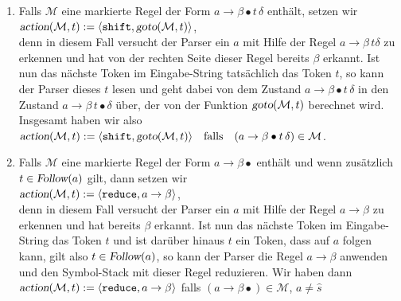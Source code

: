 \begin{enumerate}
\item Falls $\mathcal{M}$ eine markierte Regel der Form $a \rightarrow \beta \bullet t\, \delta$
      enth\"alt, setzen wir
      \\[0.2cm]
      \hspace*{1.3cm}
      $\textsl{action}(\mathcal{M},t) := \langle \texttt{shift}, \textsl{goto}(\mathcal{M},t) \rangle$,
      \\[0.2cm]
      denn in diesem Fall versucht der Parser ein $a$ mit Hilfe der Regel $a \rightarrow \beta\, t \delta$
      zu erkennen und hat von der rechten Seite dieser Regel bereits $\beta$ erkannt.
      Ist nun das n\"achste Token im Eingabe-String tats\"achlich das Token $t$, so kann der Parser
      dieses $t$ lesen und geht dabei von dem Zustand $a \rightarrow \beta \bullet t\, \delta$ in den Zustand 
      $a \rightarrow \beta\, t \bullet \delta$ \"uber, der von der Funktion $\textsl{goto}(\mathcal{M},t)$
      berechnet wird.  Insgesamt haben wir also
      \\[0.2cm]
      \hspace*{1.3cm}
      $\textsl{action}(\mathcal{M},t) := \langle \texttt{shift}, \textsl{goto}(\mathcal{M},t) \rangle
         \quad \mbox{falls} \quad (a \rightarrow \beta \bullet t\, \delta) \in \mathcal{M}
      $.
\item Falls $\mathcal{M}$ eine markierte Regel der Form $a \rightarrow \beta \bullet$ enth\"alt
      und wenn zus\"atzlich $t \in \textsl{Follow}(a)$ gilt, dann setzen wir
      \\[0.2cm]
      \hspace*{1.3cm}
      $\textsl{action}(\mathcal{M},t) := \langle \texttt{reduce}, a \rightarrow \beta \rangle$,
      \\[0.2cm]
      denn in diesem Fall versucht der Parser ein $a$ mit Hilfe der Regel $a \rightarrow \beta$
      zu erkennen und hat bereits $\beta$ erkannt. Ist nun das n\"achste Token im Eingabe-String das Token
      $t$ und ist dar\"uber hinaus $t$ ein Token, dass auf $a$ folgen kann, gilt also 
      $t \in \textsl{Follow}(a)$, so kann der Parser die Regel $a \rightarrow \beta$ anwenden und den
      Symbol-Stack mit dieser Regel reduzieren.  Wir haben dann
      \\[0.2cm]
      \hspace*{1.3cm}
      $\textsl{action}(\mathcal{M},t) := \langle \texttt{reduce}, a \rightarrow \beta \rangle$
      \quad falls 
      $(a \rightarrow \beta\bullet) \in \mathcal{M}$, $a \not= \widehat{s}$ 

\end{enumerate}
